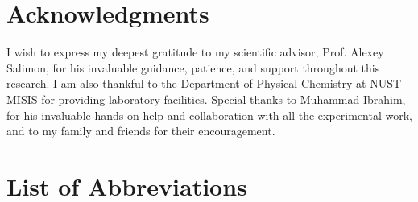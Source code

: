 \documentclass[12pt,a4paper]{report}
\begin{document}
\begin{abstract}
\textbf{Keywords:} Proton Exchange Membrane, Poly(vinyl 
alcohol), electrospinning, Citric Acid Crosslinking, 
Phosphoric Acid Doping, Density Functional Theory, 
Covalent Phosphorylation, Molecular Dynamics, Finite 
Element Analysis, Grotthuss Mechanism.
\end{abstract}

\chapter*{Acknowledgments}

I wish to express my deepest gratitude to my scientific advisor, Prof. Alexey Salimon, for his invaluable guidance, patience, and support throughout this research. I am also thankful to the Department of Physical Chemistry at NUST MISIS for providing laboratory facilities. Special thanks to Muhammad Ibrahim, for his invaluable hands-on help and collaboration with all the experimental work, and to my family and friends for their encouragement.

\tableofcontents
\listoffigures
\listoftables  

\chapter*{List of Abbreviations}
\end{document}
